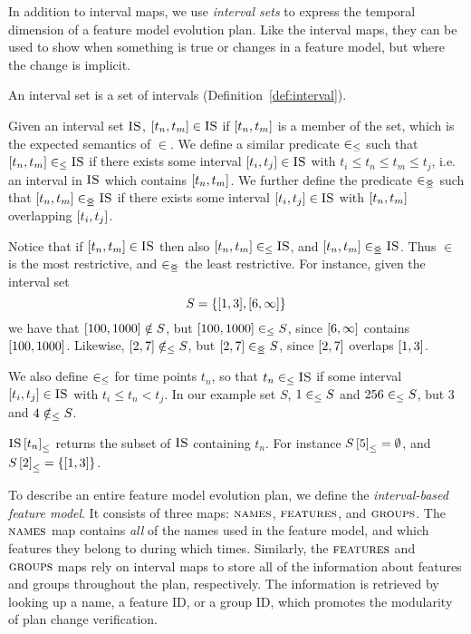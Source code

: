 In addition to interval maps, we use \emph{interval sets} to express the temporal dimension of a feature model evolution plan. Like the interval maps, they can be used to show when something is true or changes in a feature model, but where the change is implicit. 
\\
\begin{definition}
  An interval set is a set of intervals (Definition~\vref{def:interval}). 
\end{definition}

Given an interval set $\textsc{IS}$, $\interval{t_n}{t_m} \in \map{IS}$ if $\interval{t_n}{t_m}$ is a member of the set, which is the expected semantics of $\in$. We define a similar predicate $\in_\leq$ such that $\interval{t_n}{t_m} \inn \map{IS}$ if there exists some interval $\interval{t_i}{t_j} \in \map{IS}$ with $t_i \leq t_n \leq t_m \leq t_j$, i.e. an interval in $\textsc{IS}$ which contains $\interval{t_n}{t_m}$. We further define the predicate $\in_{\leq\!\!\!\!\geq{}}$ such that $\interval{t_n}{t_m} \innr \map{IS}$ if there exists some interval $\interval{t_i}{t_j} \in \map{IS}$ with $\interval{t_n}{t_m}$ overlapping $\interval{t_i}{t_j}$. 

Notice that if $\interval{t_n}{t_m} \in \map{IS}$ then also $\interval{t_n}{t_m} \inn \map{IS}$, and $\interval{t_n}{t_m} \innr \map{IS}$. Thus $\in$ is the most restrictive, and $\in_{\leq\!\!\!\!\geq{}}$ the least restrictive.
For instance, given the interval set 
\[
  S = \set{\interval{1}{3}, \interval{6}{\forever}}
\]
we have that $\interval{100}{1000} \notin S$, but $\interval{100}{1000} \inn S$, since $\interval{6}{\forever}$ contains $\interval{100}{1000}$. Likewise,  $\interval{2}{7} \notinn S$, but $\interval{2}{7} \innr S$, since $\interval{2}{7}$ overlaps $\interval{1}{3}$.


We also define $\in_\leq$ for time points $t_n$, so that $t_n \in_\leq \textsc{IS}$ if some interval $\interval{t_i}{t_j} \in \map{IS}$ with $t_i \leq t_n < t_j$. In our example set $S$, $1 \in_\leq S$ and $256 \in_\leq S$, but $3$ and $4 \notin_\leq S$.

${\textsc{IS} \left[ t_n \right]}_{\leq}$ returns the subset of $\textsc{IS}$ containing $t_n$. For instance ${S \left[ 5 \right]}_{\leq} = \emptyset$, and $\containing{S}{2} = \set{\interval{1}{3}}$.

To describe an entire feature model evolution plan, we define the \emph{interval-based feature model}. It consists of three maps: $\textsc{names}{}$, $\textsc{features}{}$, and $\textsc{groups}{}{}$. The $\textsc{names}{}$ map contains \emph{all} of the names used in the feature model, and which features they belong to during which times. Similarly, the $\textsc{features}{}$ and $\textsc{groups}{}{}$ maps rely on interval maps to store all of the information about features and groups throughout the plan, respectively. The information is retrieved by looking up a name, a feature ID, or a group ID, which promotes the modularity of plan change verification.
\\

